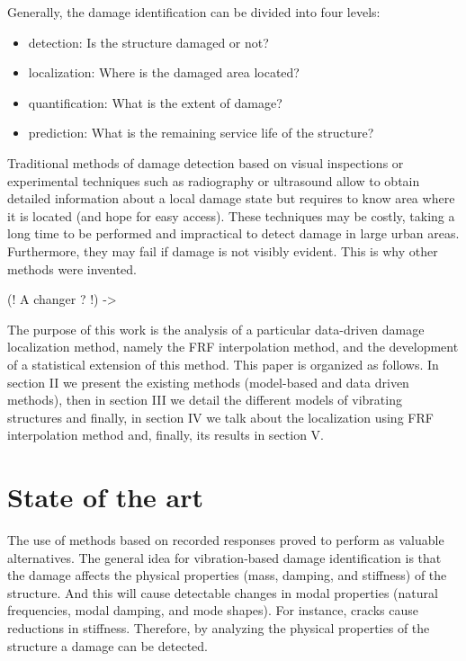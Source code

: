 \documentclass[journal]{IEEEtran}
\begin{document}
Generally, the damage identification can be divided into four levels:
\begin{itemize}
\item detection: Is the structure damaged or not?
\item localization: Where is the damaged area located?
\item quantification: What is the extent of damage?
\item prediction: What is the remaining service life of the structure?
\end{itemize}
\vspace{2mm}

Traditional methods of damage detection based on visual inspections or experimental techniques such as radiography
 or ultrasound allow to obtain detailed information about a local damage state but requires to know area where it is located (and hope for easy access). 
These techniques may be costly, taking a long time to be performed and impractical to detect damage in large urban areas.
 Furthermore, they may fail if damage is not visibly evident. This is why other methods were invented.


(! A changer ? !) ->


The purpose of this work is the analysis of a particular data-driven damage localization method,
 namely the FRF interpolation method, and the development of a statistical extension of this method.
This paper is organized as follows. In section II we  present the existing methods (model-based and data driven methods), 
then in section III we detail the different models of vibrating structures and finally, in section IV we talk about the localization using FRF interpolation method and, finally,  its results in section V.



\section{State of the art}

The use of methods based on recorded responses proved to perform as valuable alternatives. 
The general idea for vibration-based damage identification is that the damage affects the physical properties (mass, damping, and stiffness) of the structure. 
And this will cause detectable changes in modal properties (natural frequencies, modal damping, and mode shapes). 
For instance, cracks cause reductions in stiffness. Therefore, by analyzing the physical properties of the structure a damage can be detected.
\\
\end{document}
